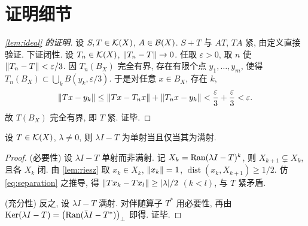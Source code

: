 \section{证明细节}\label{app:proofs}

\begin{proof}[\cref{lem:ideal} 的证明]
设 $S,T\in\mathcal{K}(X)$, $A\in\mathcal{B}(X)$. $S+T$ 与 $AT$, $TA$ 紧, 由定义直接验证. 下证闭性. 设 $T_n\in\mathcal{K}(X)$, $\lVert T_n-T\rVert\to0$. 任取 $\varepsilon>0$, 取 $n$ 使 $\lVert T_n-T\rVert<\varepsilon/3$. 因 $T_n(B_X)$ 完全有界, 存在有限个点 $y_1,\dots,y_m$, 使得 $T_n(B_X)\subset\bigcup_k B(y_k,\varepsilon/3)$. 于是对任意 $x\in B_X$, 存在 $k$,
\begin{equation*}
  \lVert Tx-y_k\rVert\le\lVert Tx-T_nx\rVert+\lVert T_nx-y_k\rVert<\frac{\varepsilon}{3}+\frac{\varepsilon}{3}<\varepsilon .
\end{equation*}
故 $T(B_X)$ 完全有界, 即 $T$ 紧. 证毕.
\end{proof}

\begin{lemma}\label{lem:fredholm}
设 $T\in\mathcal{K}(X)$, $\lambda\neq0$, 则 $\lambda I-T$ 为单射当且仅当其为满射.
\end{lemma}

\begin{proof}
(必要性) 设 $\lambda I-T$ 单射而非满射. 记 $X_k=\operatorname{Ran}(\lambda I-T)^k$, 则 $X_{k+1}\subsetneq X_k$, 且各 $X_k$ 闭. 由 \cref{lem:riesz} 取 $x_k\in X_k$, $\lVert x_k\rVert=1$, $\operatorname{dist}(x_k,X_{k+1})\ge1/2$. 仿 \cref{eq:separation} 之推导, 得 $\lVert Tx_k-Tx_l\rVert\ge\lvert\lambda\rvert/2$ $(k<l)$, 与 $T$ 紧矛盾.

(充分性) 反之, 设 $\lambda I-T$ 满射. 对伴随算子 $T^{*}$ 用必要性, 再由 $\operatorname{Ker}(\lambda I-T)=\bigl(\operatorname{Ran}(\bar\lambda I-T^{*})\bigr)_{\perp}$ 即得. 证毕.
\end{proof}
